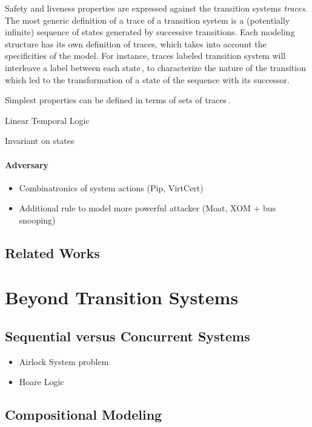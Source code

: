 \documentclass[oneside,a4paper]{memoir}
\theoremstyle{break}
\begin{document}
Safety and liveness properties are expressed against the transition systems
\emph{traces}.
%
The most generic definition of a trace of a transition system is a (potentially
infinite) sequence of states generated by successive transitions.
%
Each modeling structure has its own definition of traces, which takes into
account the specificities of the model.
%
For instance, traces labeled transition system will interleave a label between
each state\,\cite{vijayaraghavan2015modular}, to characterize the nature of the
transition which led to the transformation of a state of the sequence with its
successor.

Simplest properties can be defined in terms of sets of
traces\,\cite{schneider2000enforceable,basin2013enforceable}.

Linear Temporal Logic

Invariant on states

\paragraph{Adversary}
%
\begin{itemize}
\item Combinatronics of system actions (Pip, VirtCert)
\item Additional rule to model more powerful attacker (Moat, XOM + bus snooping)
\end{itemize}

\subsection{Related Works}

\section{Beyond Transition Systems}

\subsection{Sequential versus Concurrent Systems}

\begin{itemize}
\item Airlock System problem
\item Hoare Logic
\end{itemize}

\subsection{Compositional Modeling}
\end{document}
